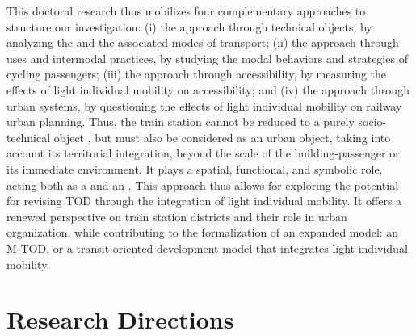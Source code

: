 \begin{refsegment}
This doctoral research thus mobilizes four complementary approaches to structure our investigation: (i) the approach through technical objects, by analyzing the  and the associated modes of transport; (ii) the approach through uses and intermodal practices, by studying the modal behaviors and strategies of cycling passengers; (iii) the approach through \gls{accessibility}, by measuring the effects of light individual mobility on accessibility; and (iv) the approach through urban systems, by questioning the effects of light individual mobility on railway urban planning. Thus, the train station cannot be reduced to a purely socio-technical object \textcolor{blue}{\autocite[]{joseph_villes_1999}}, but must also be considered as an urban object, taking into account its territorial integration, beyond the scale of the building-passenger or its immediate environment. It plays a spatial, functional, and symbolic role, acting both as a  and an  \textcolor{blue}{\autocite[5]{baron_gares_2016}}. This approach thus allows for exploring the potential for revising \acrshort{TOD} through the integration of light individual mobility. It offers a renewed perspective on train station districts and their role in urban organization, while contributing to the formalization of an expanded model: an \acrfull{M-TOD}, or a transit-oriented development model that integrates light individual mobility.%

\section*{Research Directions
    \label{introduction-generale:problematique-objectifs-hypotheses}
    }


\end{refsegment}
